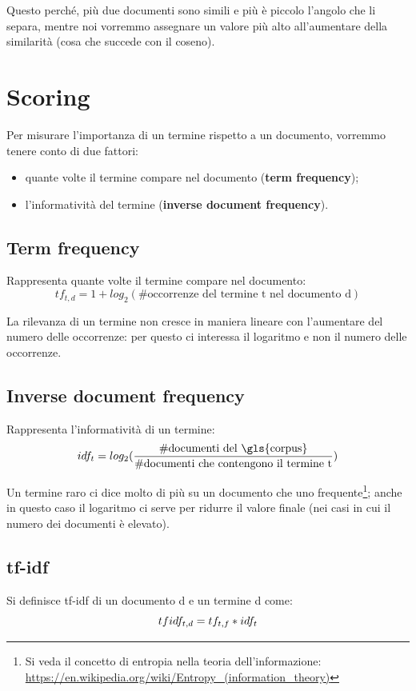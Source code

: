 Questo perché, più due documenti sono simili e più è piccolo l'angolo che li separa, mentre noi vorremmo assegnare un valore più alto all'aumentare della similarità (cosa che succede con il coseno). 

\section{Scoring}
Per misurare l'importanza di un termine rispetto a un documento, vorremmo tenere conto di due fattori:
\begin{itemize}
    \item quante volte il termine compare nel documento (\textbf{term frequency});
    \item l'informatività del termine (\textbf{inverse document frequency}).
\end{itemize}

\subsection{Term frequency}
Rappresenta quante volte il termine compare nel documento:
\begin{equation}
    tf_{t,d} = 1 + log_2(\text{\#occorrenze del termine t nel documento d})
\end{equation}

La rilevanza di un termine non cresce in maniera lineare con l'aumentare del numero delle occorrenze: per questo ci interessa il logaritmo e non il numero delle occorrenze.

\subsection{Inverse document frequency}
Rappresenta l'informatività di un termine:
\begin{equation}
    idf_t = log_2(\frac{\text{\#documenti del \gls{corpus}}}{\text{\#documenti che contengono il termine t}})
\end{equation}

Un termine raro ci dice molto di più su un documento che uno frequente\footnote{Si veda il concetto di entropia nella teoria dell'informazione: \url{https://en.wikipedia.org/wiki/Entropy_(information_theory)}}; anche in questo caso il logaritmo ci serve per ridurre il valore finale (nei casi in cui il numero dei documenti è elevato).

\subsection{tf-idf}
Si definisce tf-idf di un documento d e un termine d come:
    \begin{equation}
        tf\-idf_{t,d} = tf_{t,f} * idf_{t}
    \end{equation} 

